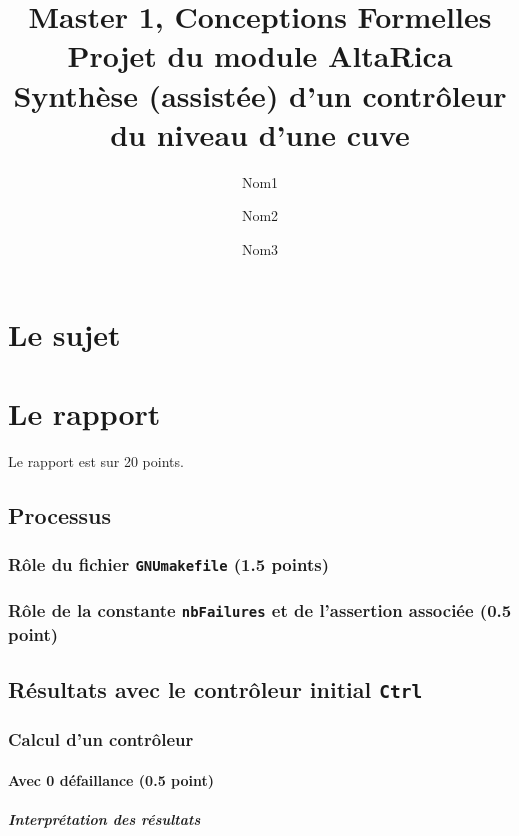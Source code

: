 \documentclass[a4paper]{book}
\newcommand{\altarica}{{\sc AltaRica}}
\begin{document}
\title{Master 1, Conceptions Formelles\\
Projet du module \altarica\\
Synthèse (assistée) d'un contrôleur du niveau d'une cuve}

\date{}

\author{Nom1 \and Nom2 \and Nom3}

\maketitle

\chapter{Le sujet}


\chapter{Le rapport}
Le rapport est sur 20 points.

\section{Processus}
\subsection{Rôle du fichier {\tt GNUmakefile} (1.5 points)}

\subsection{Rôle de la constante {\tt nbFailures} et de l'assertion associée (0.5 point)}

\section{Résultats avec le contrôleur initial {\tt Ctrl}}
\subsection{Calcul d'un contrôleur}
\subsubsection{Avec 0 défaillance (0.5 point)}

\paragraph{Interprétation des résultats}
\end{document}
